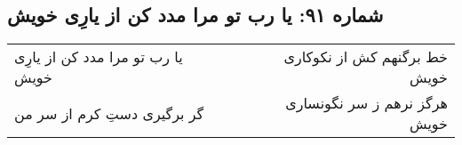 \begin{center}
\section*{شماره ۹۱: یا رب تو مرا مدد کن از یارِی خویش}
\label{sec:091}
\begin{longtable}{l p{0.5cm} r}
یا رب تو مرا مدد کن از یارِی خویش
&&
خط برگنهم کش از نکوکاری خویش
\\
گر برگیری دستِ کرم از سر من
&&
هرگز نرهم ز سر نگونساری خویش
\\
\end{longtable}
\end{center}
